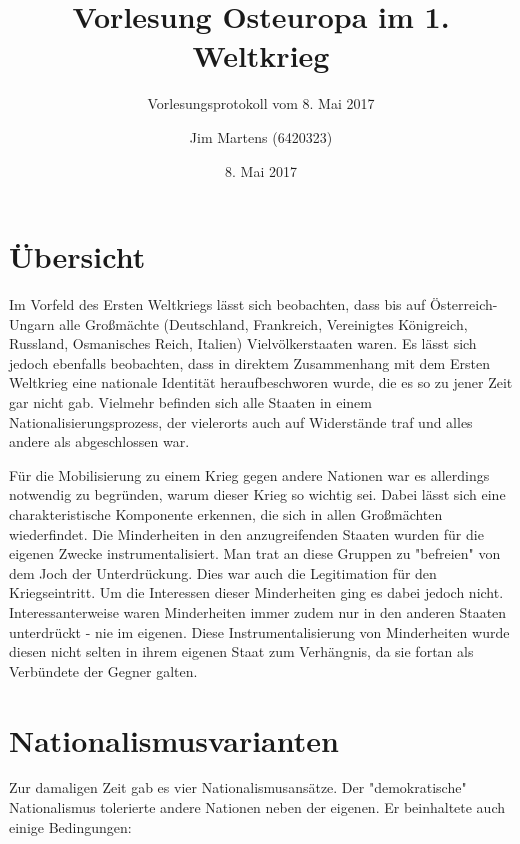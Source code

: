 \documentclass[10pt,a4paper,oneside,ngerman,numbers=noenddot]{scrartcl}
\begin{document}
\author{Jim Martens (6420323)}
\title{Vorlesung Osteuropa im 1. Weltkrieg}
\subtitle{Vorlesungsprotokoll vom 8. Mai 2017}
\date{8. Mai 2017}
\maketitle

\section*{Übersicht}

Im Vorfeld des Ersten Weltkriegs lässt sich beobachten, dass bis auf
Österreich-Ungarn alle Großmächte (Deutschland, Frankreich, Vereinigtes
Königreich, Russland, Osmanisches Reich, Italien) Vielvölkerstaaten waren.
Es lässt sich jedoch ebenfalls beobachten, dass in direktem Zusammenhang mit
dem Ersten Weltkrieg eine nationale Identität heraufbeschworen wurde, die es
so zu jener Zeit gar nicht gab. Vielmehr befinden sich alle Staaten in einem
Nationalisierungsprozess, der vielerorts auch auf Widerstände traf und alles
andere als abgeschlossen war.

Für die Mobilisierung zu einem Krieg gegen andere Nationen war es allerdings
notwendig zu begründen, warum dieser Krieg so wichtig sei. Dabei lässt sich eine
charakteristische Komponente erkennen, die sich in allen Großmächten wiederfindet.
Die Minderheiten in den anzugreifenden Staaten wurden für die eigenen Zwecke
instrumentalisiert. Man trat an diese Gruppen zu "befreien" von dem Joch der
Unterdrückung. Dies war auch die Legitimation für den Kriegseintritt. Um die
Interessen dieser Minderheiten ging es dabei jedoch nicht. Interessanterweise waren
Minderheiten immer zudem nur in den anderen Staaten unterdrückt - nie im eigenen.
Diese Instrumentalisierung von Minderheiten wurde diesen nicht selten in ihrem
eigenen Staat zum Verhängnis, da sie fortan als Verbündete der Gegner galten.

\section*{Nationalismusvarianten}

Zur damaligen Zeit gab es vier Nationalismusansätze. Der "demokratische"
Nationalismus tolerierte andere Nationen neben der eigenen. Er beinhaltete auch
einige Bedingungen:
\end{document}

